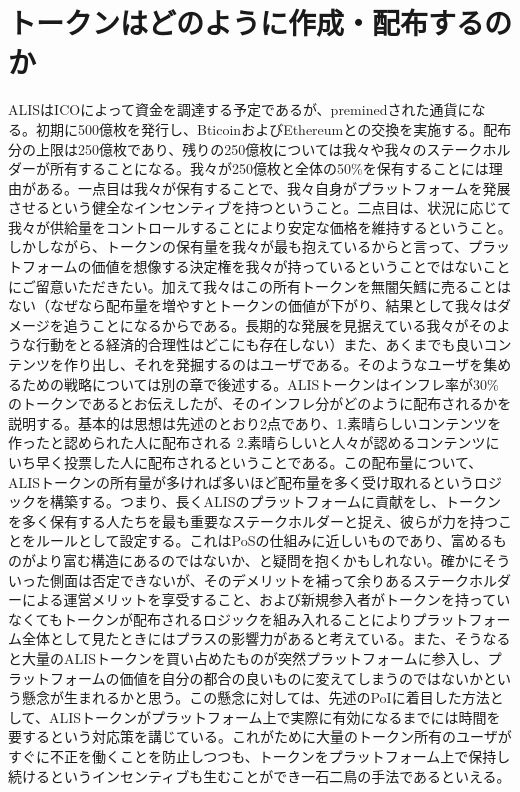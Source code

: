 \documentclass{jsarticle}
\begin{document}
\section{トークンはどのように作成・配布するのか}
ALISはICOによって資金を調達する予定であるが、preminedされた通貨になる。初期に500億枚を発行し、BticoinおよびEthereumとの交換を実施する。配布分の上限は250億枚であり、残りの250億枚については我々や我々のステークホルダーが所有することになる。我々が250億枚と全体の50\%を保有することには理由がある。一点目は我々が保有することで、我々自身がプラットフォームを発展させるという健全なインセンティブを持つということ。二点目は、状況に応じて我々が供給量をコントロールすることにより安定な価格を維持するということ。しかしながら、トークンの保有量を我々が最も抱えているからと言って、プラットフォームの価値を想像する決定権を我々が持っているということではないことにご留意いただきたい。加えて我々はこの所有トークンを無闇矢鱈に売ることはない（なぜなら配布量を増やすとトークンの価値が下がり、結果として我々はダメージを追うことになるからである。長期的な発展を見据えている我々がそのような行動をとる経済的合理性はどこにも存在しない）また、あくまでも良いコンテンツを作り出し、それを発掘するのはユーザである。そのようなユーザを集めるための戦略については別の章で後述する。ALISトークンはインフレ率が30\%のトークンであるとお伝えしたが、そのインフレ分がどのように配布されるかを説明する。基本的は思想は先述のとおり2点であり、1.素晴らしいコンテンツを作ったと認められた人に配布される 2.素晴らしいと人々が認めるコンテンツにいち早く投票した人に配布されるということである。この配布量について、ALISトークンの所有量が多ければ多いほど配布量を多く受け取れるというロジックを構築する。つまり、長くALISのプラットフォームに貢献をし、トークンを多く保有する人たちを最も重要なステークホルダーと捉え、彼らが力を持つことをルールとして設定する。これはPoSの仕組みに近しいものであり、富めるものがより富む構造にあるのではないか、と疑問を抱くかもしれない。確かにそういった側面は否定できないが、そのデメリットを補って余りあるステークホルダーによる運営メリットを享受すること、および新規参入者がトークンを持っていなくてもトークンが配布されるロジックを組み入れることによりプラットフォーム全体として見たときにはプラスの影響力があると考えている。また、そうなると大量のALISトークンを買い占めたものが突然プラットフォームに参入し、プラットフォームの価値を自分の都合の良いものに変えてしまうのではないかという懸念が生まれるかと思う。この懸念に対しては、先述のPoIに着目した方法として、ALISトークンがプラットフォーム上で実際に有効になるまでには時間を要するという対応策を講じている。これがために大量のトークン所有のユーザがすぐに不正を働くことを防止しつつも、トークンをプラットフォーム上で保持し続けるというインセンティブも生むことができ一石二鳥の手法であるといえる。
\end{document}
